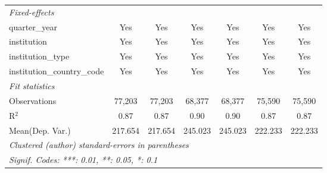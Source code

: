 \begin{tabular}{lcccccc}
   \midrule
   \emph{Fixed-effects}\\
   quarter\_year                      & Yes         & Yes      & Yes         & Yes     & Yes         & Yes\\  
   institution                        & Yes         & Yes      & Yes         & Yes     & Yes         & Yes\\  
   institution\_type                  & Yes         & Yes      & Yes         & Yes     & Yes         & Yes\\  
   institution\_country\_code         & Yes         & Yes      & Yes         & Yes     & Yes         & Yes\\  
   \midrule
   \emph{Fit statistics}\\
   Observations                       & 77,203      & 77,203   & 68,377      & 68,377  & 75,590      & 75,590\\  
   R$^2$                              & 0.87        & 0.87     & 0.90        & 0.90    & 0.87        & 0.87\\  
Mean(Dep. Var.) & 217.654 & 217.654 & 245.023 & 245.023 & 222.233 & 222.233 \\
   \midrule \midrule
   \multicolumn{7}{l}{\emph{Clustered (author) standard-errors in parentheses}}\\
   \multicolumn{7}{l}{\emph{Signif. Codes: ***: 0.01, **: 0.05, *: 0.1}}\\
\end{tabular}
\par\endgroup
